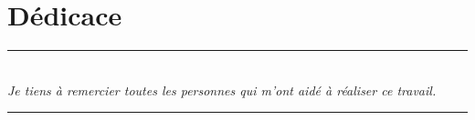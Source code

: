 

\chapter*{Dédicace}
\begin{flushright}
\rule{\linewidth}{0.1mm} \\[0.4cm]
\textit{Je tiens à remercier toutes les personnes qui m'ont aidé à réaliser ce travail.\\[0.5cm]
\lipsum[3]}
\rule{\linewidth}{0.1mm} \\[0.4cm]
\end{flushright}
\vspace*{\fill}

\restoregeometry



